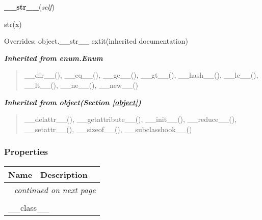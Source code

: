     \vspace{0.5ex}

\hspace{.8\funcindent}\begin{boxedminipage}{\funcwidth}

    \raggedright \textbf{\_\_str\_\_}(\textit{self})

\setlength{\parskip}{2ex}
    str(x)

\setlength{\parskip}{1ex}
      Overrides: object.\_\_str\_\_ 	extit{(inherited documentation)}

    \end{boxedminipage}


\large{\textbf{\textit{Inherited from enum.Enum}}}

\begin{quote}
\_\_dir\_\_(), \_\_eq\_\_(), \_\_ge\_\_(), \_\_gt\_\_(), \_\_hash\_\_(), \_\_le\_\_(), \_\_lt\_\_(), \_\_ne\_\_(), \_\_new\_\_()
\end{quote}

\large{\textbf{\textit{Inherited from object\textit{(Section \ref{object})}}}}

\begin{quote}
\_\_delattr\_\_(), \_\_getattribute\_\_(), \_\_init\_\_(), \_\_reduce\_\_(), \_\_setattr\_\_(), \_\_sizeof\_\_(), \_\_subclasshook\_\_()
\end{quote}


  \subsubsection{Properties}

    \vspace{-1cm}
\hspace{\varindent}\begin{longtable}{|p{\varnamewidth}|p{\vardescrwidth}|l}
\cline{1-2}
\cline{1-2} \centering \textbf{Name} & \centering \textbf{Description}& \\
\cline{1-2}
\endhead\cline{1-2}\multicolumn{3}{r}{\small\textit{continued on next page}}\\\endfoot\cline{1-2}
\endlastfoot\multicolumn{2}{|l|}{\textit{Inherited from object \textit{(Section \ref{object})}}}\\
\multicolumn{2}{|p{\varwidth}|}{\raggedright \_\_class\_\_}\\
\cline{1-2}
\end{longtable}



